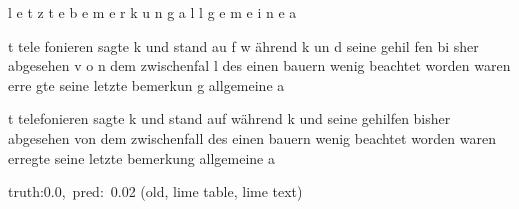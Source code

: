 \documentclass[a4paper,10pt,twoside]{article}
\begin{document}
{\color[rgb]{0.0,0,0} l}{\color[rgb]{0.0,0,0} e}{\color[rgb]{0.0,0,0} t}{\color[rgb]{0.0,0,0} z}{\color[rgb]{0.0,0,0} t}{\color[rgb]{0.0,0,0} e} {\color[rgb]{0.0,0,0} b}{\color[rgb]{0.0,0,0} e}{\color[rgb]{0.0,0,0} m}{\color[rgb]{0.0,0,0} e}{\color[rgb]{0.0,0,0} r}{\color[rgb]{0.0,0,0} k}{\color[rgb]{0.0,0,0} u}{\color[rgb]{0.0,0,0} n}{\color[rgb]{0.0,0,0} g} {\color[rgb]{0.0,0,0} a}{\color[rgb]{0.0,0,0} l}{\color[rgb]{0.0,0,0} l}{\color[rgb]{0.0,0,0} g}{\color[rgb]{0.0,0,0} e}{\color[rgb]{0.0,0,0} m}{\color[rgb]{0.0,0,0} e}{\color[rgb]{0.0,0,0} i}{\color[rgb]{0.0,0,0} n}{\color[rgb]{0.0,0,0} e} {\color[rgb]{0.0,0,0} a}

t tele{\color[rgb]{0,0,1} f}onieren   sagte k  {\color[rgb]{0,0,1} u}nd stand au{\color[rgb]{1,0,0} f}  w{\color[rgb]{0,0,1} ä}hrend {\color[rgb]{0,0,1} k}  un{\color[rgb]{0,0,1} d} seine gehil{\color[rgb]{1,0,0} f}en {\color[rgb]{0,0,1} b}i{\color[rgb]{0,0,1} s}her  abgesehen v{\color[rgb]{0,0,1} o}{\color[rgb]{1,0,0} n} dem {\color[rgb]{1,0,0} z}wischenfal{\color[rgb]{0,0,1} l} des einen {\color[rgb]{1,0,0} b}auern  {\color[rgb]{1,0,0} w}enig beachtet worden waren  erre{\color[rgb]{0,0,1} g}te seine letzte bemerkun{\color[rgb]{0,0,1} g} allgemeine a

 t telefonieren sagte k und stand auf während {\color[rgb]{0,0,1} k} und seine {\color[rgb]{0,0,1} gehilfen} bisher abgesehen {\color[rgb]{0,0,1} von} dem zwischenfall des einen bauern wenig beachtet worden waren {\color[rgb]{0,0,1} erregte} {\color[rgb]{0,0,1} seine} letzte bemerkung allgemeine a

 {\footnotesize {\color[rgb]{0.6, 0.6, 0.6}truth:0.0,~pred:~0.02}} (old, lime table, lime text)\hrulefill
\end{document}
